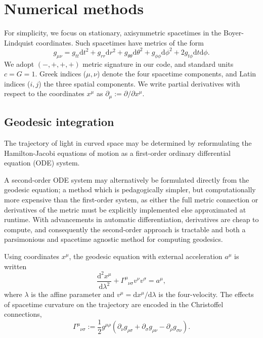 \documentclass[fleqn,usenatbib]{mnras}
\renewcommand{\d}{\text{d}}
\newcommand{\utensor}[3]{#1^{#2}_{\phantom{#2}#3}}
\newcommand{\vel}[1]{v^{#1}}
\begin{document}
\section{Numerical methods}
\label{sec:numerical-methods}

For simplicity, we focus on stationary, axisymmetric spacetimes in the
Boyer-Lindquist coordinates. Such spacetimes have metrics of the form
\begin{equation}
\label{eq:stationary_axisymmetric_metric}
    g_{\mu\nu}
    = g_{tt} \d t^2
    + g_{rr} \d r^2
    + g_{\theta\theta} \d \theta^2
    + g_{\phi\phi} \d \phi^2
    + 2g_{t\phi} \d t \d \phi.
\end{equation}
We adopt $(-, +, +, +)$ metric signature in our code, and standard units $c = G
= 1$. Greek indices ($\mu, \nu$) denote the four spacetime components, and Latin
indices ($i, j$) the three spatial components. We write partial derivatives with
respect to the coordinates $x^\mu$ as $\partial_\mu := \partial / \partial
x^\mu$.

\subsection{Geodesic integration}

The trajectory of light in curved space may be determined by reformulating the
Hamilton-Jacobi equations of motion as a first-order ordinary differential
equation (ODE) system.

A second-order ODE system may alternatively be formulated directly from the
geodesic equation; a method which is pedagogically simpler, but computationally
more expensive than the first-order system, as either the full metric connection
or derivatives of the metric must be explicitly implemented else approximated at
runtime. With advancements in automatic differentiation, derivatives are cheap
to compute, and consequently the second-order approach is tractable and both a
parsimonious and spacetime agnostic method for computing geodesics.

Using coordinates $x^\mu$, the geodesic equation with external acceleration
$a^\mu$ is written
\begin{equation}
\label{eq:geodesic_equation}
    \frac{\d^2 x^\mu}{\d \lambda^2}
    + \utensor{\Gamma}{\mu}{\nu\sigma}
    \vel{\nu}
    \vel{\sigma}
    = a^\mu,
\end{equation}
where $\lambda$ is the affine parameter and $v^\mu = \d x^\mu / \d \lambda$ is
the four-velocity. The effects of spacetime curvature on the trajectory are
encoded in the Christoffel connections,
\begin{equation}
\label{eq:christoffel}
    \utensor{\Gamma}{\mu}{\nu\sigma}
    := \frac{1}{2} g^{\mu\rho}
    \left(
        \partial_{\nu}g_{\rho \sigma}
        + \partial_{\sigma}g_{\rho \nu}
        - \partial_{\rho}g_{\sigma \nu}
    \right).
\end{equation}
\end{document}
